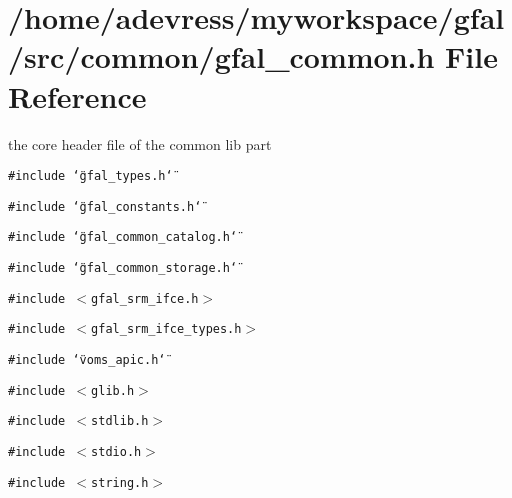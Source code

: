 \section{/home/adevress/myworkspace/gfal/src/common/gfal\_\-common.h File Reference}
\label{gfal__common_8h}
the core header file of the common lib part 

{\tt \#include \char`\"{}gfal\_\-types.h\char`\"{}}\par
{\tt \#include \char`\"{}gfal\_\-constants.h\char`\"{}}\par
{\tt \#include \char`\"{}gfal\_\-common\_\-catalog.h\char`\"{}}\par
{\tt \#include \char`\"{}gfal\_\-common\_\-storage.h\char`\"{}}\par
{\tt \#include $<$gfal\_\-srm\_\-ifce.h$>$}\par
{\tt \#include $<$gfal\_\-srm\_\-ifce\_\-types.h$>$}\par
{\tt \#include \char`\"{}voms\_\-apic.h\char`\"{}}\par
{\tt \#include $<$glib.h$>$}\par
{\tt \#include $<$stdlib.h$>$}\par
{\tt \#include $<$stdio.h$>$}\par
{\tt \#include $<$string.h$>$}\par
